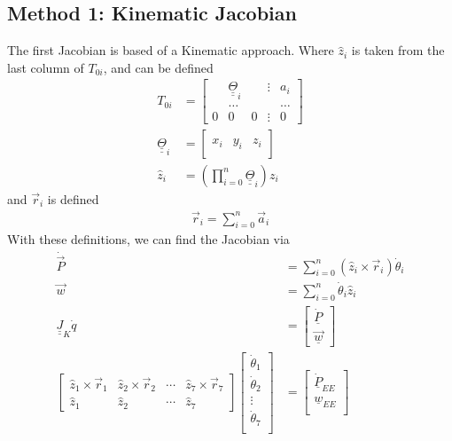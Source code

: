 \documentclass{article}
\def\du#1{\underline{\underline{#1}}}
\begin{document}
\subsection{Method 1: Kinematic Jacobian}
The first Jacobian is based of a Kinematic approach.
Where $\hat{z}_i$ is taken from the last column of $T_{0i}$, and can be defined~\cite{mae225_notes}
\begin{align*}
T_{0i} &=
\left[\begin{matrix}
  & \du{\Theta}_i &   & \vdots & a_i \\
  & \hdots   &   &        & \hdots \\
0 &        0 & 0 & \vdots & 0
\end{matrix}\right] \\
\du{\Theta}_i &=
\left[\begin{matrix}
& & \\
x_i & y_i & z_i \\
& &
\end{matrix}\right] \\
\hat{z}_i &= \left( \prod_{i=0}^n \du{\Theta}_i \right) z_i
\end{align*}
and $\vec{r}_i$ is defined
\begin{align*}
\vec{r}_i = \sum_{i=0}^n \vec{a}_i
\end{align*}
With these definitions, we can find the Jacobian via
\begin{align*}
\dot{\vec{P}} &= \sum_{i=0}^{n} \left( \hat{z}_i \times \vec{r}_i \right) \dot{\theta}_i \\
\vec{w} &= \sum_{i=0}^{n} \dot{\theta}_i \hat{z}_i \\
\du{J}_K \dot{q} &=
\left[\begin{matrix}
\underline{\dot{P}} \\
\underline{\vec{w}}
\end{matrix}\right] \\
\left[\begin{matrix}
\hat{z}_1 \times \vec{r}_1 & \hat{z}_2 \times \vec{r}_2 & \cdots & \hat{z}_7 \times \vec{r}_7 \\
\hat{z}_1 & \hat{z}_2 & \cdots & \hat{z}_7
\end{matrix}\right]
\left[\begin{matrix}
\dot{\theta}_1 \\
\dot{\theta}_2 \\
\vdots \\
\dot{\theta}_7 \\
\end{matrix}\right]
&=
\left[\begin{matrix}
\underline{\dot{P}}_{EE} \\
\underline{w}_{EE} \\
\end{matrix}\right] \\
\end{align*}
\end{document}
